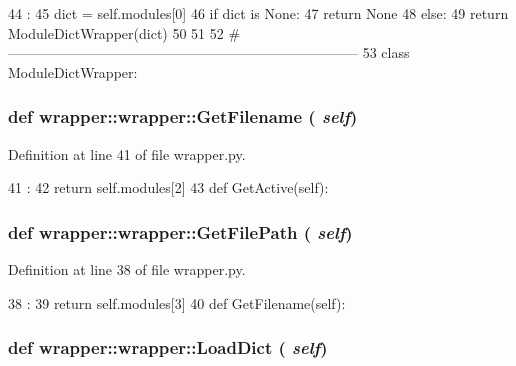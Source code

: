 \begin{DoxyCode}
44                        :
45         dict = self.modules[0]
46         if dict is None:
47             return None
48         else:
49             return ModuleDictWrapper(dict)
50 
51 
52 #---------------------------------------------------------------------------
53 
class ModuleDictWrapper:
\end{DoxyCode}
\hypertarget{classwrapper_1_1wrapper_ae0c31da2925082f7d02d24e665d9d8f2}{
\subsubsection[{GetFilename}]{\setlength{\rightskip}{0pt plus 5cm}def wrapper::wrapper::GetFilename ( {\em self})}}
\label{classwrapper_1_1wrapper_ae0c31da2925082f7d02d24e665d9d8f2}


Definition at line 41 of file wrapper.py.


\begin{DoxyCode}
41                          :
42         return self.modules[2]
43 
    def GetActive(self):
\end{DoxyCode}
\hypertarget{classwrapper_1_1wrapper_a874fd66ca205b3e79a22e1d3ae7254c5}{
\subsubsection[{GetFilePath}]{\setlength{\rightskip}{0pt plus 5cm}def wrapper::wrapper::GetFilePath ( {\em self})}}
\label{classwrapper_1_1wrapper_a874fd66ca205b3e79a22e1d3ae7254c5}


Definition at line 38 of file wrapper.py.


\begin{DoxyCode}
38                          :
39         return self.modules[3]
40 
    def GetFilename(self):
\end{DoxyCode}
\hypertarget{classwrapper_1_1wrapper_a0aef3490086e1e271039044259f1966c}{
\subsubsection[{LoadDict}]{\setlength{\rightskip}{0pt plus 5cm}def wrapper::wrapper::LoadDict ( {\em self})}}
\label{classwrapper_1_1wrapper_a0aef3490086e1e271039044259f1966c}


